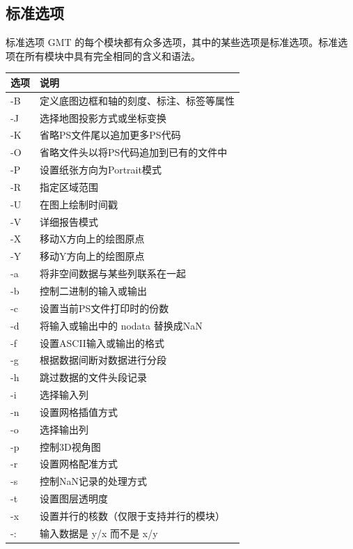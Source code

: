 \documentclass[UTF8, 11pt]{ctexbeamer}
\begin{document}
\subsection{标准选项}
\begin{frame}[fragile]{标准选项}
GMT 的每个模块都有众多选项，其中的某些选项是标准选项。标准选项在所有模块中具有完全相同的含义和语法。
\tiny
\begin{center}
\begin{tabular}{ll}
选项 & 说明 \\
\hline
-B & 定义底图边框和轴的刻度、标注、标签等属性 \\
-J & 选择地图投影方式或坐标变换 \\
-K & 省略PS文件尾以追加更多PS代码 \\
-O & 省略文件头以将PS代码追加到已有的文件中 \\
-P & 设置纸张方向为Portrait模式 \\
-R & 指定区域范围 \\
-U & 在图上绘制时间戳 \\
-V & 详细报告模式 \\
-X & 移动X方向上的绘图原点 \\
-Y & 移动Y方向上的绘图原点 \\
-a & 将非空间数据与某些列联系在一起 \\
-b & 控制二进制的输入或输出 \\
-c & 设置当前PS文件打印时的份数 \\
-d & 将输入或输出中的 nodata 替换成NaN \\
-f & 设置ASCII输入或输出的格式 \\
-g & 根据数据间断对数据进行分段 \\
-h & 跳过数据的文件头段记录 \\
-i & 选择输入列 \\
-n & 设置网格插值方式 \\
-o & 选择输出列 \\
-p & 控制3D视角图 \\
-r & 设置网格配准方式 \\
-s & 控制NaN记录的处理方式 \\
-t & 设置图层透明度 \\
-x & 设置并行的核数（仅限于支持并行的模块）\\
-: & 输入数据是 y/x 而不是 x/y \\
\end{tabular}
\end{center}
\end{frame}
\end{document}
